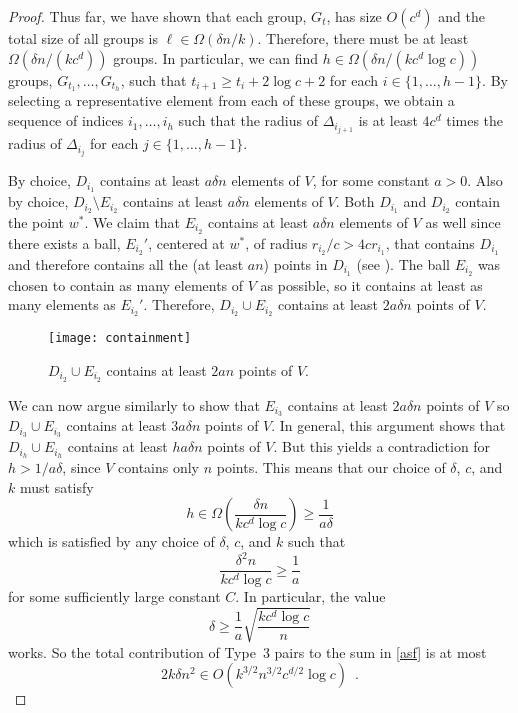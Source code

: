 \documentclass{patmorin}
\begin{document}
\begin{proof}
  Thus far, we have shown that each group, $G_t$, has size $O(c^d)$
  and the total size of all groups is $\ell\in\Omega(\delta n/k)$.
  Therefore, there must be at least $\Omega(\delta n/(kc^d))$ groups.
  In particular, we can find $h\in\Omega(\delta n/(kc^d\log c))$ groups,
  $G_{t_1},\ldots,G_{t_h}$, such that $t_{i+1} \ge t_{i}+2\log c+2$ for
  each $i\in\{1,\ldots,h-1\}$.  By selecting a representative element from
  each of these groups, we obtain a sequence of indices $i_1,\ldots,i_h$
  such that the radius of $\Delta_{i_{j+1}}$ is at least $4c^d$ times
  the radius of $\Delta_{i_j}$ for each $j\in\{1,\ldots,h-1\}$.

  By choice, $D_{i_1}$ contains at least $ a \delta n$ elements of
  $V$, for some constant $ a  >0$.  Also by choice, $D_{i_2}\setminus
  E_{i_2}$ contains at least $ a \delta n$ elements of $V$.
  Both $D_{i_1}$ and $D_{i_2}$ contain the point $w^*$.  We claim
  that $E_{i_2}$ contains at least $ a \delta n$ elements of $V$
  as well since there exists a ball, $E_{i_2}'$, centered at $w^*$,
  of radius $r_{i_2}/c > 4cr_{i_1}$, that contains $D_{i_1}$ and
  therefore contains all the (at least $ a  n$) points in $D_{i_1}$
  (see ).  The ball $E_{i_2}$ was chosen to contain
  as many elements of $V$ as possible, so it contains at least as many
  elements as $E_{i_2}'$.  Therefore, $D_{i_2}\cup E_{i_2}$ contains at
  least $2 a  \delta n$ points of $V$.

  \begin{figure}
     \begin{center}
       \texttt{[image: containment]}
     \end{center}
     \caption{$D_{i_2}\cup E_{i_2}$ contains at least $2 a  n$ 
              points of $V$.}
   \end{figure}

  We can now argue similarly to show that $E_{i_3}$ contains at
  least $2 a \delta n$ points of $V$ so $D_{i_3}\cup E_{i_3}$
  contains at least $3 a \delta n$ points of $V$.  In general,
  this argument shows that $D_{i_h}\cup E_{i_h}$ contains at least
  $h a \delta n$ points of $V$.  But this yields a contradiction for
  $h> 1/ a \delta$, since $V$ contains only $n$ points.  This means
  that our choice of $\delta$, $c$, and $k$ must satisfy
  \[
       h\in\Omega\left(\frac{\delta n}{kc^d\log c}\right) \ge
          \frac{1}{ a  \delta}
  \]
  which is satisfied by any choice of $\delta$, $c$, and $k$ such that
  \[
       \frac{\delta^2 n}{kc^d\log c} \ge \frac{1}{a}
  \]
  for some sufficiently large constant $C$.  In particular, the value
  \[
       \delta \ge \frac{1}{a}\sqrt{\frac{kc^d\log c}{n}}
  \]
  works.
  So the total contribution of Type~3 pairs to the sum in \eqref{asf}
  is at most
  \[
    2k\delta n^2 \in O(k^{3/2}n^{3/2}c^{d/2}\log c) \enspace .
  \]


\end{proof}
\end{document}

